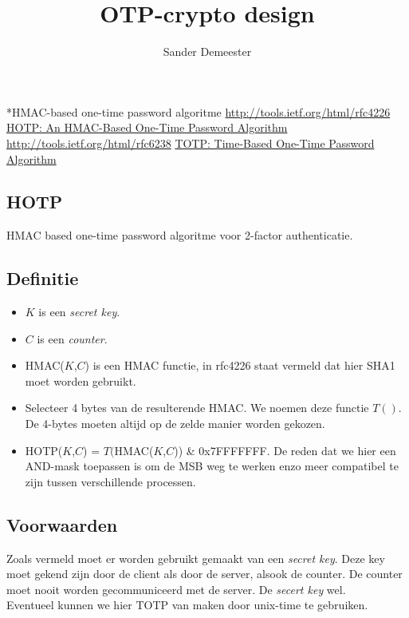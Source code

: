\documentclass[10pt,a4paper]{report}
\author{Sander Demeester}
\title{OTP-crypto design}
\begin{document}
\begin{section}*{HMAC-based one-time password algoritme}
\url{http://tools.ietf.org/html/rfc4226}
\href{http://tools.ietf.org/html/rfc4226}{HOTP: An HMAC-Based One-Time Password Algorithm}\\
\url{http://tools.ietf.org/html/rfc6238}
\href{http://tools.ietf.org/html/rfc6238}{TOTP: Time-Based One-Time Password Algorithm}
\section*{HOTP}
HMAC based one-time password algoritme voor 2-factor authenticatie.
\subsection*{Definitie}
\begin{itemize}
\item $K$ is een \emph{secret key}.
\item $C$ is een \emph{counter}.
\item HMAC($K$,$C$) is een HMAC functie, in rfc4226 staat vermeld dat hier SHA1 moet worden gebruikt. 
\item Selecteer 4 bytes van de resulterende HMAC. We noemen deze functie $T()$. De 4-bytes moeten altijd op de zelde manier worden gekozen.
\item HOTP($K$,$C$) = $T($HMAC($K$,$C$)) \& 0x7FFFFFFF. De reden dat we hier een AND-mask toepassen is om de MSB weg te werken enzo meer compatibel te zijn tussen verschillende processen.
\end{itemize}
\subsection*{Voorwaarden}
Zoals vermeld moet er worden gebruikt gemaakt van een \emph{secret key}. Deze key moet gekend zijn door de client als door de server, alsook de counter. De counter moet nooit worden gecommuniceerd met de server. De \emph{secert key} wel.\\

Eventueel kunnen we hier TOTP van maken door unix-time te gebruiken.
\end{section}
\end{document}
